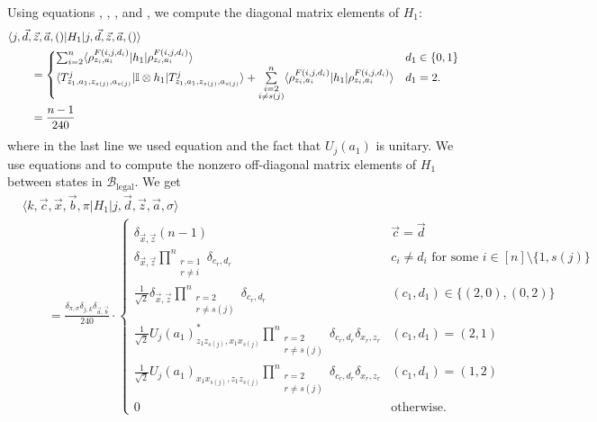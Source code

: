 \documentclass[../thesis-main/thesis-main]{subfiles}
\begin{document}
Using equations , , , and , we compute the diagonal matrix elements of $H_{1}$:
\begin{align}
&\langle j,\vec{d},\vec{z},\vec{a},()|H_{1}|j,\vec{d},\vec{z},\vec{a},()\rangle \nonumber\\
&\qquad  =\begin{cases}
\sum_{i=2}^{n}\langle\rho_{z_{i},a_{i}}^{F(i,j,d_{i})}|h_{1}|\rho_{z_{i},a_{i}}^{F(i,j,d_{i})}\rangle & d_{1}\in\{0,1\}\\
\langle T_{z_{1},a_{1},z_{s(j)},a_{s(j)}}^{j}|\mathbb{I}\otimes h_{1}|T_{z_{1},a_{1},z_{s(j)},a_{s(j)}}^{j}\rangle+\underset{\substack{i=2\\
i\neq s(j)
}
}{\overset{n}{\sum}}\langle\rho_{z_{i},a_{i}}^{F(i,j,d_{i})}|h_{1}|\rho_{z_{i},a_{i}}^{F(i,j,d_{i})}\rangle & d_{1}=2.
\end{cases} \\
 &\qquad =\frac{n-1}{240} \label{eq:diag_H1}
\end{align}
where in the last line we used equation  and the fact that $U_{j}(a_{1})$ is unitary. We use equations  and  to compute the nonzero off-diagonal matrix elements of $H_{1}$ between states in $\mathcal{B}_{{\text{legal}}}$. We get
\begin{align}
&\langle k,\vec{c},\vec{x},\vec{b},\pi|H_{1}|j,\vec{d},\vec{z},\vec{a},\sigma\rangle\nonumber\\
&\qquad =\frac{\delta_{\pi,\sigma} \delta_{j,k}\delta_{\vec{a},\vec{b}}}{240}\cdot\begin{cases}
\delta_{\vec{x},\vec{z}}(n-1) & \vec{c}=\vec{d}\\
\delta_{\vec{x},\vec{z}}\underset{\substack{r=1\\
r\neq i
}
}{\overset{n}{\prod}}\delta_{c_{r},d_{r}} & c_{i} \neq d_{i} \text{ for some } i\in[n]\setminus\{1,s(j)\} \\
\frac{1}{\sqrt{2}}\delta_{\vec{x},\vec{z}}\underset{\substack{r=2\\
r\neq s(j)
}
}{\overset{n}{\prod}}\delta_{c_{r},d_{r}} & (c_{1},d_{1})\in\{(2,0),(0,2)\}\\
\frac{1}{\sqrt{2}} U_{j}(a_{1})^{*}_{z_{1}z_{s(j)},x_{1}x_{s(j)}} \underset{\substack{r=2\\
r\neq s(j)
}
}{\overset{n}{\prod}}\delta_{c_{r},d_{r}}\delta_{x_r,z_r} & (c_{1},d_{1})=(2,1)\\
\frac{1}{\sqrt{2}} U_{j}(a_{1})_{x_{1}x_{s(j)},z_{1}z_{s(j)}} \underset{\substack{r=2\\
r\neq s(j)
}
}{\overset{n}{\prod}}\delta_{c_{r},d_{r}}\delta_{x_r,z_r} & (c_{1},d_{1})=(1,2)\\
0 & \text{otherwise.}
\end{cases}\label{eq:off_diag_H1}
\end{align}
\end{document}
